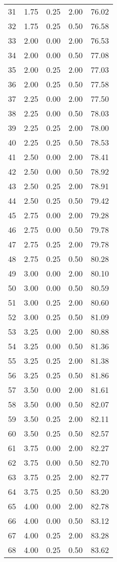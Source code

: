 \begin{tabular}{rrrrr}
  31 & 1.75 & 0.25 & 2.00 & 76.02 \\ 
  32 & 1.75 & 0.25 & 0.50 & 76.58 \\ 
  33 & 2.00 & 0.00 & 2.00 & 76.53 \\ 
  34 & 2.00 & 0.00 & 0.50 & 77.08 \\ 
  35 & 2.00 & 0.25 & 2.00 & 77.03 \\ 
  36 & 2.00 & 0.25 & 0.50 & 77.58 \\ 
  37 & 2.25 & 0.00 & 2.00 & 77.50 \\ 
  38 & 2.25 & 0.00 & 0.50 & 78.03 \\ 
  39 & 2.25 & 0.25 & 2.00 & 78.00 \\ 
  40 & 2.25 & 0.25 & 0.50 & 78.53 \\ 
  41 & 2.50 & 0.00 & 2.00 & 78.41 \\ 
  42 & 2.50 & 0.00 & 0.50 & 78.92 \\ 
  43 & 2.50 & 0.25 & 2.00 & 78.91 \\ 
  44 & 2.50 & 0.25 & 0.50 & 79.42 \\ 
  45 & 2.75 & 0.00 & 2.00 & 79.28 \\ 
  46 & 2.75 & 0.00 & 0.50 & 79.78 \\ 
  47 & 2.75 & 0.25 & 2.00 & 79.78 \\ 
  48 & 2.75 & 0.25 & 0.50 & 80.28 \\ 
  49 & 3.00 & 0.00 & 2.00 & 80.10 \\ 
  50 & 3.00 & 0.00 & 0.50 & 80.59 \\ 
  51 & 3.00 & 0.25 & 2.00 & 80.60 \\ 
  52 & 3.00 & 0.25 & 0.50 & 81.09 \\ 
  53 & 3.25 & 0.00 & 2.00 & 80.88 \\ 
  54 & 3.25 & 0.00 & 0.50 & 81.36 \\ 
  55 & 3.25 & 0.25 & 2.00 & 81.38 \\ 
  56 & 3.25 & 0.25 & 0.50 & 81.86 \\ 
  57 & 3.50 & 0.00 & 2.00 & 81.61 \\ 
  58 & 3.50 & 0.00 & 0.50 & 82.07 \\ 
  59 & 3.50 & 0.25 & 2.00 & 82.11 \\ 
  60 & 3.50 & 0.25 & 0.50 & 82.57 \\ 
  61 & 3.75 & 0.00 & 2.00 & 82.27 \\ 
  62 & 3.75 & 0.00 & 0.50 & 82.70 \\ 
  63 & 3.75 & 0.25 & 2.00 & 82.77 \\ 
  64 & 3.75 & 0.25 & 0.50 & 83.20 \\ 
  65 & 4.00 & 0.00 & 2.00 & 82.78 \\ 
  66 & 4.00 & 0.00 & 0.50 & 83.12 \\ 
  67 & 4.00 & 0.25 & 2.00 & 83.28 \\ 
  68 & 4.00 & 0.25 & 0.50 & 83.62 \\ 
   \hline
\end{tabular}
